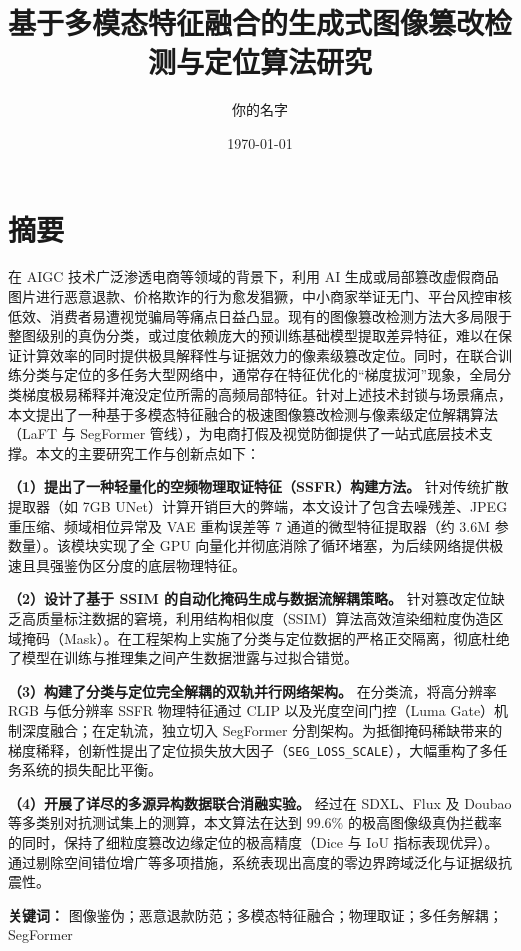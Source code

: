 \documentclass[UTF8, a4paper, 12pt]{ctexrep}
\title{基于多模态特征融合的生成式图像篡改检测与定位算法研究}
\author{你的名字}
\date{\today}
\begin{document}
\maketitle

\chapter*{摘\quad 要}

在 AIGC 技术广泛渗透电商等领域的背景下，利用 AI 生成或局部篡改虚假商品图片进行恶意退款、价格欺诈的行为愈发猖獗，中小商家举证无门、平台风控审核低效、消费者易遭视觉骗局等痛点日益凸显。现有的图像篡改检测方法大多局限于整图级别的真伪分类，或过度依赖庞大的预训练基础模型提取差异特征，难以在保证计算效率的同时提供极具解释性与证据效力的像素级篡改定位。同时，在联合训练分类与定位的多任务大型网络中，通常存在特征优化的“梯度拔河”现象，全局分类梯度极易稀释并淹没定位所需的高频局部特征。针对上述技术封锁与场景痛点，本文提出了一种基于多模态特征融合的极速图像篡改检测与像素级定位解耦算法（LaFT 与 SegFormer 管线），为电商打假及视觉防御提供了一站式底层技术支撑。本文的主要研究工作与创新点如下：

\textbf{（1）提出了一种轻量化的空频物理取证特征（SSFR）构建方法。} 针对传统扩散提取器（如 7GB UNet）计算开销巨大的弊端，本文设计了包含去噪残差、JPEG重压缩、频域相位异常及 VAE 重构误差等 7 通道的微型特征提取器（约 3.6M 参数量）。该模块实现了全 GPU 向量化并彻底消除了循环堵塞，为后续网络提供极速且具强鉴伪区分度的底层物理特征。

\textbf{（2）设计了基于 SSIM 的自动化掩码生成与数据流解耦策略。} 针对篡改定位缺乏高质量标注数据的窘境，利用结构相似度（SSIM）算法高效渲染细粒度伪造区域掩码（Mask）。在工程架构上实施了分类与定位数据的严格正交隔离，彻底杜绝了模型在训练与推理集之间产生数据泄露与过拟合错觉。

\textbf{（3）构建了分类与定位完全解耦的双轨并行网络架构。} 在分类流，将高分辨率 RGB 与低分辨率 SSFR 物理特征通过 CLIP 以及光度空间门控（Luma Gate）机制深度融合；在定轨流，独立切入 SegFormer 分割架构。为抵御掩码稀缺带来的梯度稀释，创新性提出了定位损失放大因子（\texttt{SEG\_LOSS\_SCALE}），大幅重构了多任务系统的损失配比平衡。

\textbf{（4）开展了详尽的多源异构数据联合消融实验。} 经过在 SDXL、Flux 及 Doubao 等多类别对抗测试集上的测算，本文算法在达到 $99.6\%$ 的极高图像级真伪拦截率的同时，保持了细粒度篡改边缘定位的极高精度（Dice 与 IoU 指标表现优异）。通过剔除空间错位增广等多项措施，系统表现出高度的零边界跨域泛化与证据级抗震性。

\vspace{1ex}
\noindent \textbf{关键词：} 图像鉴伪；恶意退款防范；多模态特征融合；物理取证；多任务解耦；SegFormer
\end{document}
